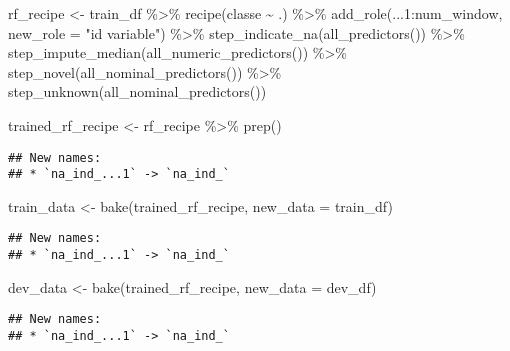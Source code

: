 \documentclass[
]{article}
\newenvironment{Shaded}{\begin{snugshade}}{\end{snugshade}}
\newcommand{\AttributeTok}[1]{\textcolor[rgb]{0.77,0.63,0.00}{#1}}
\newcommand{\FunctionTok}[1]{\textcolor[rgb]{0.00,0.00,0.00}{#1}}
\newcommand{\NormalTok}[1]{#1}
\newcommand{\OtherTok}[1]{\textcolor[rgb]{0.56,0.35,0.01}{#1}}
\newcommand{\SpecialCharTok}[1]{\textcolor[rgb]{0.00,0.00,0.00}{#1}}
\newcommand{\StringTok}[1]{\textcolor[rgb]{0.31,0.60,0.02}{#1}}
\begin{document}
\begin{Shaded}
\begin{Highlighting}[]
\NormalTok{rf\_recipe }\OtherTok{\textless{}{-}}\NormalTok{ train\_df }\SpecialCharTok{\%\textgreater{}\%}
    \FunctionTok{recipe}\NormalTok{(classe }\SpecialCharTok{\textasciitilde{}}\NormalTok{ .) }\SpecialCharTok{\%\textgreater{}\%} 
    \FunctionTok{add\_role}\NormalTok{(}\StringTok{\textasciigrave{}}\AttributeTok{...1}\StringTok{\textasciigrave{}}\SpecialCharTok{:}\NormalTok{num\_window, }\AttributeTok{new\_role =} \StringTok{"id variable"}\NormalTok{) }\SpecialCharTok{\%\textgreater{}\%} 
    \FunctionTok{step\_indicate\_na}\NormalTok{(}\FunctionTok{all\_predictors}\NormalTok{()) }\SpecialCharTok{\%\textgreater{}\%} 
    \FunctionTok{step\_impute\_median}\NormalTok{(}\FunctionTok{all\_numeric\_predictors}\NormalTok{()) }\SpecialCharTok{\%\textgreater{}\%} 
    \FunctionTok{step\_novel}\NormalTok{(}\FunctionTok{all\_nominal\_predictors}\NormalTok{()) }\SpecialCharTok{\%\textgreater{}\%} 
    \FunctionTok{step\_unknown}\NormalTok{(}\FunctionTok{all\_nominal\_predictors}\NormalTok{())}

\NormalTok{trained\_rf\_recipe }\OtherTok{\textless{}{-}}\NormalTok{ rf\_recipe }\SpecialCharTok{\%\textgreater{}\%} \FunctionTok{prep}\NormalTok{()}
\end{Highlighting}
\end{Shaded}

\begin{verbatim}
## New names:
## * `na_ind_...1` -> `na_ind_`
\end{verbatim}

\begin{Shaded}
\begin{Highlighting}[]
\NormalTok{train\_data }\OtherTok{\textless{}{-}} \FunctionTok{bake}\NormalTok{(trained\_rf\_recipe, }\AttributeTok{new\_data =}\NormalTok{ train\_df)}
\end{Highlighting}
\end{Shaded}

\begin{verbatim}
## New names:
## * `na_ind_...1` -> `na_ind_`
\end{verbatim}

\begin{Shaded}
\begin{Highlighting}[]
\NormalTok{dev\_data }\OtherTok{\textless{}{-}} \FunctionTok{bake}\NormalTok{(trained\_rf\_recipe, }\AttributeTok{new\_data =}\NormalTok{ dev\_df)}
\end{Highlighting}
\end{Shaded}

\begin{verbatim}
## New names:
## * `na_ind_...1` -> `na_ind_`
\end{verbatim}
\end{document}
